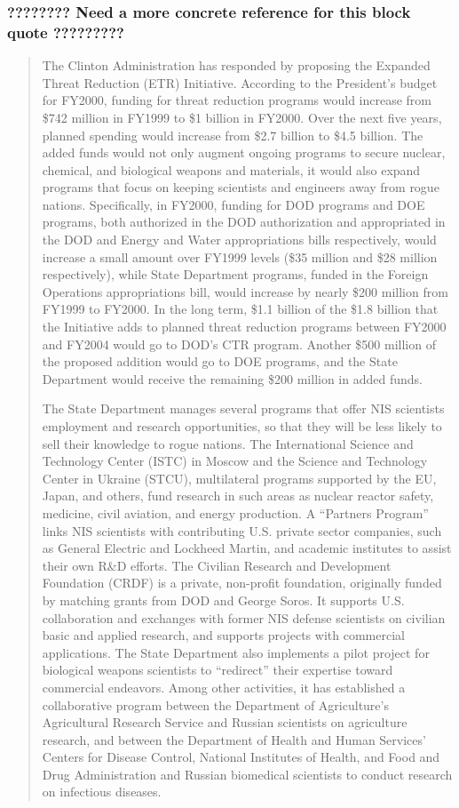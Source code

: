 \documentclass{report}
\begin{document}
\subsubsection{????????  Need a more concrete reference for this block quote   ?????????}


\blockquote{The Clinton Administration has responded by proposing the Expanded Threat Reduction (ETR) Initiative. According to the President's budget for FY2000, funding for threat reduction programs would increase from \$742 million in FY1999 to \$1 billion in FY2000. Over the next five years, planned spending would increase from \$2.7 billion to \$4.5 billion. The added funds would not only augment ongoing programs to secure nuclear, chemical, and biological weapons and materials, it would also expand programs that focus on keeping scientists and engineers away from rogue nations. Specifically, in FY2000, funding for DOD programs and DOE programs, both authorized in the DOD authorization and appropriated in the DOD and Energy and Water appropriations bills respectively, would increase a small amount over FY1999 levels (\$35 million and \$28 million respectively), while State Department programs, funded in the Foreign Operations appropriations bill, would increase by nearly \$200 million from FY1999 to FY2000. In the long term, \$1.1 billion of the \$1.8 billion that the Initiative adds to planned threat reduction programs between FY2000 and FY2004 would go to DOD's CTR program. Another \$500 million of the proposed addition would go to DOE programs, and the State Department would receive the remaining \$200 million in added funds.

The State Department manages several programs that offer NIS scientists employment and research opportunities, so that they will be less likely to sell their knowledge to rogue nations. The International Science and Technology Center (ISTC) in Moscow and the Science and Technology Center in Ukraine (STCU), multilateral programs supported by the EU, Japan, and others, fund research in such areas as nuclear reactor safety, medicine, civil aviation, and energy production. A \enquote{Partners Program} links NIS scientists with contributing U.S. private sector companies, such as General Electric and Lockheed Martin, and academic institutes to assist their own R\&D efforts. The Civilian Research and Development Foundation (CRDF) is a private, non-profit foundation, originally funded by matching grants from DOD and George Soros. It supports U.S. collaboration and exchanges with former NIS defense scientists on civilian basic and applied research, and supports projects with commercial applications. The State Department also implements a pilot project for biological weapons scientists to \enquote{redirect} their expertise toward commercial endeavors. Among other activities, it has established a collaborative program between the Department of Agriculture's Agricultural Research Service and Russian scientists on agriculture research, and between the Department of Health and Human Services' Centers for Disease Control, National Institutes of Health, and Food and Drug Administration and Russian biomedical scientists to conduct research on infectious diseases. }
\end{document}
